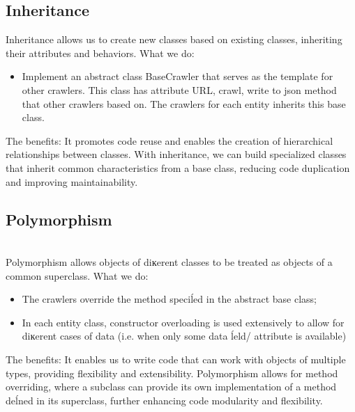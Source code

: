 \documentclass[a4paper,10pt,notitlepage]{article}
\begin{document}
{\subsection{Inheritance}
Inheritance allows us to create new classes based on existing classes, inheriting
their attributes and behaviors. 
What we do: 
\begin{itemize}
    \item Implement an abstract class BaseCrawler that serves as the template for other crawlers. This class has attribute URL, crawl, write to json method that other crawlers based on. The crawlers for each entity inherits this base class.
\end{itemize}
The benefits:
It promotes code reuse and enables the creation of hierarchical relationships
between classes. With inheritance, we can build specialized classes that inherit
common characteristics from a base class, reducing code duplication and
improving maintainability.
\subsection{Polymorphism}\\
Polymorphism allows objects of diĸerent classes to be treated as objects of a
common superclass.
What we do:
\begin{itemize}
    \item The crawlers override the method speciĺed in the abstract base class;
    \item In each entity class, constructor overloading is used extensively to allow for diĸerent cases of data (i.e. when only some data ĺeld/ attribute is available)
\end{itemize}
The benefits:
It enables us to write code that can work with objects of multiple types,
providing flexibility and extensibility. Polymorphism allows for method
overriding, where a subclass can provide its own implementation of a method
deĺned in its superclass, further enhancing code modularity and flexibility.
}
\end{document}
